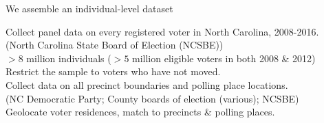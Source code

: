 \documentclass[xcolor=dvipsnames, 11pt, table]{beamer}
\begin{document}
\begin{frame}{We assemble an individual-level dataset}

	\pause
	Collect panel data on every registered voter in North Carolina, 2008-2016. \vspace*{-.08in} \\
	{\color{gray}\tiny{(North Carolina State Board of Election (NCSBE))}} \color{black} \normalsize \\

	\footnotesize \vspace*{.05in}
		\hspace*{.2in} $>8$ million individuals ($>5$ million eligible voters in both 2008 \& 2012) \\
		\hspace*{.2in} Restrict the sample to voters who have not moved. \\



	\pause \normalsize \vspace{0.15in}
	Collect data on all precinct boundaries and polling place locations. \vspace*{-.08in} \\
	{\color{gray}\tiny{(NC Democratic Party; County boards of election (various); NCSBE)}} \color{black} \normalsize \\


	\pause \normalsize
	\vspace{.15in}
	Geolocate voter residences, match to precincts \& polling places.  \vspace*{-.08in} \\


\end{frame}














\end{document}
